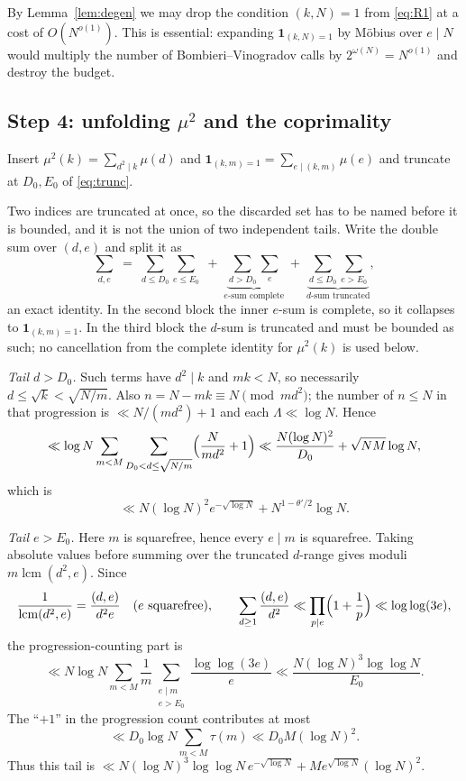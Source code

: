 \documentclass[11pt,a4paper]{article}
\theoremstyle{plain}
\theoremstyle{definition}
\theoremstyle{remark}
\DeclareMathOperator{\lcm}{lcm}
\begin{document}
By Lemma~\ref{lem:degen} we may drop the condition $(k,N)=1$ from
\eqref{eq:R1} at a cost of $O(N^{o(1)})$. This is essential: expanding
$\mathbf 1_{(k,N)=1}$ by M\"obius over $e\mid N$ would multiply the
number of Bombieri--Vinogradov calls by $2^{\omega(N)}=N^{o(1)}$ and
destroy the budget.

\subsection{Step 4: unfolding \texorpdfstring{$\mu^2$}{mu-squared} and the
coprimality}

Insert $\mu^2(k)=\sum_{d^2\mid k}\mu(d)$ and
$\mathbf 1_{(k,m)=1}=\sum_{e\mid(k,m)}\mu(e)$ and truncate at
$D_0,E_0$ of \eqref{eq:trunc}.

Two indices are truncated at once, so the discarded set has to be named
before it is bounded, and it is not the union of two independent tails.
Write the double sum over $(d,e)$ and split it as
\begin{equation}\label{eq:twotails}
  \sum_{d,e}\;=\;\sum_{d\le D_0}\sum_{e\le E_0}
  \;+\;\underbrace{\sum_{d>D_0}\sum_{e}}_{\text{$e$-sum complete}}
  \;+\;\underbrace{\sum_{d\le D_0}\sum_{e>E_0}}_{\text{$d$-sum truncated}},
\end{equation}
an exact identity. In the second block the inner $e$-sum is complete,
so it collapses to $\mathbf 1_{(k,m)=1}$. In the third block the
$d$-sum is truncated and must be bounded as such; no cancellation from
the complete identity for $\mu^2(k)$ is used below.

\emph{Tail $d>D_0$.} Such terms have $d^2\mid k$ and $mk<N$, so
necessarily $d\le\sqrt{k}<\sqrt{N/m}$.  Also
$n=N-mk\equiv N\pmod{md^2}$; the number of $n\le N$ in that
progression is $\ll N/(md^2)+1$ and each $\Lambda\ll\log N$. Hence
\[
  \ll\log N\sum_{m<M}\sum_{D_0<d\le\sqrt{N/m}}
       \Bigl(\frac{N}{md^2}+1\Bigr)
  \ll\frac{N(\log N)^2}{D_0}+\sqrt{NM}\log N,
\]
which is
\[
  \ll N(\log N)^2e^{-\sqrt{\log N}}+N^{1-\theta'/2}\log N.
\]

\emph{Tail $e>E_0$.} Here $m$ is squarefree, hence every $e\mid m$
is squarefree.  Taking absolute values before summing over the truncated
$d$-range gives moduli $m\lcm(d^2,e)$.  Since
\[
 \frac1{\lcm(d^2,e)}=\frac{(d,e)}{d^2e}
 \quad(e\ \hbox{squarefree}),\qquad
 \sum_{d\ge1}\frac{(d,e)}{d^2}\ll\prod_{p\mid e}\Bigl(1+\frac1p\Bigr)
 \ll\log\log(3e),
\]
the progression-counting part is
\[
 \ll N\log N\sum_{m<M}\frac1m
       \sum_{\substack{e\mid m\\e>E_0}}
       \frac{\log\log(3e)}e
 \ll \frac{N(\log N)^3\log\log N}{E_0}.
\]
The ``$+1$'' in the progression count contributes at most
\[
 \ll D_0\log N\sum_{m<M}\tau(m)
 \ll D_0M(\log N)^2.
\]
Thus this tail is
$\ll N(\log N)^3\log\log N\,e^{-\sqrt{\log N}}
   +M e^{\sqrt{\log N}}(\log N)^2$.
\end{document}
